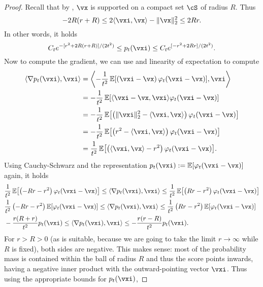 \documentclass[../../book-main.tex]{subfiles}
\begin{document}
\begin{proof}
    Recall that by , \(\vx\) is supported on a compact set \(\cS\) of radius \(R\). Thus 
    \begin{equation}
        -2R(r + R) \leq 2\ip{\vxi}{\vx} - \norm{\vx}_{2}^{2} \leq 2Rr.
    \end{equation}
    In other words, it holds
    \begin{equation}
        C_{t}e^{-[r^{2} + 2R(r + R)]/(2t^{2})} \leq p_{t}(\vxi) \leq C_{t}e^{[-r^{2} + 2Rr]/(2t^{2})}.
    \end{equation}
    Now to compute the gradient, we can use  and linearity of expectation to compute
    \begin{align}
        \ip{\nabla p_{t}(\vxi)}{\vxi}
        &= \ip*{-\frac{1}{t^{2}}\Ex\rs{\bp{\vxi - \vx}\phi_{t}(\vxi - \vx)}}{\vxi} \\
        &= -\frac{1}{t^{2}}\Ex\rs{\ip{\vxi - \vx}{\vxi}\phi_{t}(\vxi - \vx)} \\
        &= -\frac{1}{t^{2}}\Ex\rs{\bp{\norm{\vxi}_{2}^{2} - \ip{\vxi}{\vx}}\phi_{t}(\vxi - \vx)} \\
        &= -\frac{1}{t^{2}}\Ex\rs{\bp{r^{2} - \ip{\vxi}{\vx}}\phi_{t}(\vxi - \vx)} \\
        &= \frac{1}{t^{2}}\Ex\rs{\bp{\ip{\vxi}{\vx} - r^{2}}\phi_{t}(\vxi - \vx)}.
    \end{align}
    Using Cauchy-Schwarz and the representation \(p_{t}(\vxi) := \Ex[\phi_{t}(\vxi - \vx)]\) again, it holds
    \begin{align}
        &\frac{1}{t^{2}}\Ex\rs{\bp{-Rr - r^{2}}\phi_{t}(\vxi - \vx)} \leq \ip{\nabla p_{t}(\vxi)}{\vxi} \leq \frac{1}{t^{2}}\Ex\rs{\bp{Rr - r^{2}}\phi_{t}(\vxi - \vx)} \\
        &\frac{1}{t^{2}}\bp{-Rr - r^{2}}\Ex\rs{\phi_{t}(\vxi - \vx)} \leq \ip{\nabla p_{t}(\vxi)}{\vxi} \leq \frac{1}{t^{2}}\bp{Rr - r^{2}}\Ex\rs{\phi_{t}(\vxi - \vx)} \\
        &-\frac{r(R + r)}{t^{2}}p_{t}(\vxi) \leq \ip{\nabla p_{t}(\vxi)}{\vxi} \leq -\frac{r(r - R)}{t^{2}}p_{t}(\vxi).
    \end{align}
    For \(r > R > 0\) (as is suitable, because we are going to take the limit \(r \to \infty\) while \(R\) is fixed), both sides are negative. This makes sense: most of the probability mass is contained within the ball of radius \(R\) and thus the score points inwards, having a negative inner product with the outward-pointing vector \(\vxi\). Thus using the appropriate bounds for \(p_{t}(\vxi)\),

\end{proof}
\end{document}
